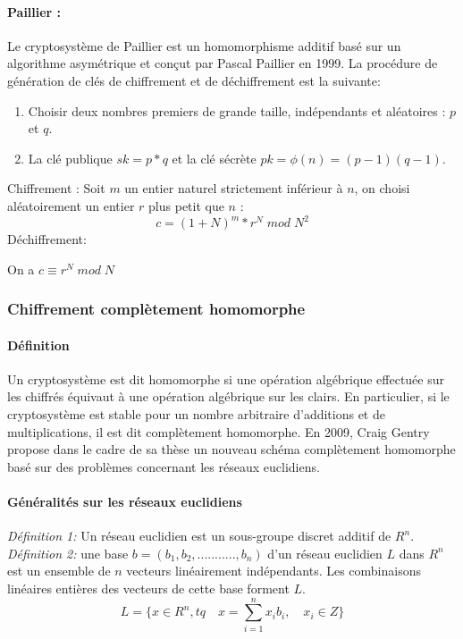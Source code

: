\documentclass[a4paper,12pt]{article}
\begin{document}
\paragraph{Paillier : }
Le cryptosystème de Paillier est un homomorphisme additif basé sur un algorithme asymétrique et conçut par Pascal Paillier en 1999.\newline
La procédure de génération de clés de chiffrement et de déchiffrement est la suivante:
\begin{enumerate}
\item Choisir deux nombres premiers de grande taille, indépendants et aléatoires : $p$   et $q$.
\item La clé publique $sk = p*q$ et la clé sécrète $pk = \phi(n) = (p - 1)(q -1)$.\end{enumerate}
Chiffrement :\newline
Soit $m$ un entier naturel strictement inférieur à $n$, on choisi aléatoirement un entier $r$ plus petit que $n$ :\newline
$$c = (1+N)^m * r^N\;mod\; N^2$$
Déchiffrement:\newline

On a $c \equiv r^N\;mod\; N$
\subsubsection{Chiffrement complètement homomorphe}
          \paragraph{Définition }
Un cryptosystème est dit homomorphe si une opération algébrique effectuée sur les chiffrés équivaut à une opération algébrique sur les clairs. En particulier, si le cryptosystème est stable pour un nombre arbitraire d'additions et de multiplications, il est dit complètement homomorphe.\newline
En 2009, Craig Gentry propose dans le cadre de sa thèse un nouveau schéma complètement homomorphe basé sur des problèmes concernant les réseaux euclidiens.
\paragraph{Généralités sur les réseaux euclidiens}
\textit{ Définition 1:} Un réseau euclidien est un sous-groupe discret additif de $R^n$.\newline
\newline
\textit{ Définition 2:} une base $b= (b_1,b_2,...........,b_n)$  d’un réseau euclidien $L$ dans $R^n$ est un ensemble de $n$ vecteurs 
linéairement indépendants. Les combinaisons linéaires entières des vecteurs de cette base forment $L$.
$$L = \{x\in R^n, tq\quad x = \sum_{i=1}^{n} x_ib_i,\quad x_i\in Z\}$$
\newline
\newline    
\end{document}
